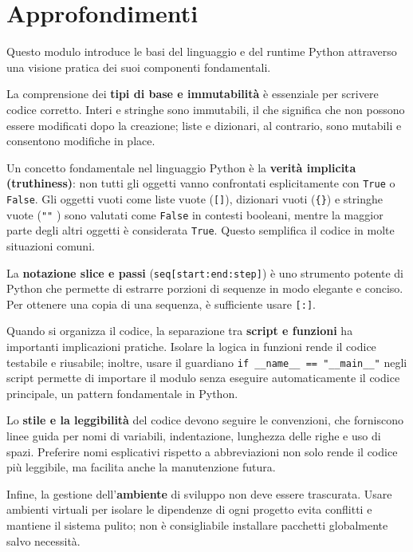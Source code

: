 \section{Approfondimenti}
\begin{tcolorbox}[title=Spiegazioni dettagliate]
	Questo modulo introduce le basi del linguaggio e del runtime Python attraverso una visione pratica dei suoi componenti fondamentali.
	
	La comprensione dei \textbf{tipi di base e immutabilità} è essenziale per scrivere codice corretto.
	Interi e stringhe sono immutabili, il che significa che non possono essere modificati dopo la creazione; liste e dizionari, al contrario, sono mutabili e consentono modifiche in place.
	
	Un concetto fondamentale nel linguaggio Python è la \textbf{verità implicita (truthiness)}: non tutti gli oggetti vanno confrontati esplicitamente con \verb|True| o \verb|False|.
	Gli oggetti vuoti come liste vuote (\verb|[]|), dizionari vuoti (\verb|{}|) e stringhe vuote (\verb|""| ) sono valutati come \verb|False| in contesti booleani, mentre la maggior parte degli altri oggetti è considerata \verb|True|.
	Questo semplifica il codice in molte situazioni comuni.
	
	La \textbf{notazione slice e passi} (\verb|seq[start:end:step]|) è uno strumento potente di Python che permette di estrarre porzioni di sequenze in modo elegante e conciso.
	Per ottenere una copia di una sequenza, è sufficiente usare \verb|[:]|.
	
	Quando si organizza il codice, la separazione tra \textbf{script e funzioni} ha importanti implicazioni pratiche.
	Isolare la logica in funzioni rende il codice testabile e riusabile; inoltre, usare il guardiano \verb|if __name__ == "__main__"| negli script permette di importare il modulo senza eseguire automaticamente il codice principale, un pattern fondamentale in Python.
	
	Lo \textbf{stile e la leggibilità} del codice devono seguire le convenzioni, che forniscono linee guida per nomi di variabili, indentazione, lunghezza delle righe e uso di spazi.
	Preferire nomi esplicativi rispetto a abbreviazioni non solo rende il codice più leggibile, ma facilita anche la manutenzione futura.
	
	Infine, la gestione dell'\textbf{ambiente} di sviluppo non deve essere trascurata.
	Usare ambienti virtuali per isolare le dipendenze di ogni progetto evita conflitti e mantiene il sistema pulito; non è consigliabile installare pacchetti globalmente salvo necessità.
\end{tcolorbox}

